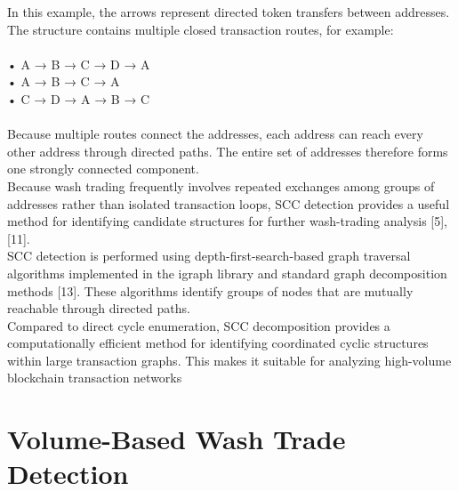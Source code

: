 \documentclass[language=english,thesis=bachelor,nosecondtitle,faculty=cb,onesided,12pt]{hsmw-thesis}
\begin{document}
In this example, the arrows represent directed token transfers between addresses. The structure contains multiple closed transaction routes, for example:\\
\\
•	A → B → C → D → A \\
•	A → B → C → A \\
•	C → D → A → B → C \\
\\
Because multiple routes connect the addresses, each address can reach every other address through directed paths. The entire set of addresses therefore forms one strongly connected component.\\
Because wash trading frequently involves repeated exchanges among groups of addresses rather than isolated transaction loops, SCC detection provides a useful method for identifying candidate structures for further wash-trading analysis [5], [11].\\
SCC detection is performed using depth-first-search-based graph traversal algorithms implemented in the igraph library and standard graph decomposition methods [13]. These algorithms identify groups of nodes that are mutually reachable through directed paths.\\
Compared to direct cycle enumeration, SCC decomposition provides a computationally efficient method for identifying coordinated cyclic structures within large transaction graphs. This makes it suitable for analyzing high-volume blockchain transaction networks

	\section{Volume-Based Wash Trade Detection}
\end{document}
